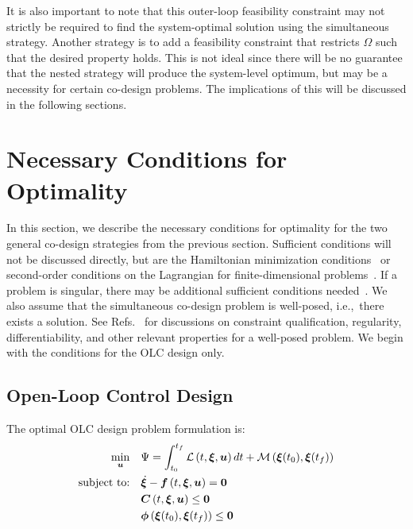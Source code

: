It is also important to note that this outer-loop feasibility constraint may not strictly be required to find the system-optimal solution using the simultaneous strategy.
Another strategy is to add a feasibility constraint that restricts $\Omega$ such that the desired property holds.
This is not ideal since there will be no guarantee that the nested strategy will produce the system-level optimum, but may be a necessity for certain co-design problems.
The implications of this will be discussed in the following sections.

\section{Necessary Conditions for Optimality \label{sec:ch3:conditions}}

In this section, we describe the necessary conditions for optimality for the two general co-design strategies from the previous section. Sufficient conditions will not be discussed directly, but are the Hamiltonian minimization conditions~\cite{Liberzon2012a, Chachuat2007a, Bryson1975a} or second-order conditions on the Lagrangian for finite-dimensional problems~\cite{Papalambros2017a}.
If a problem is singular, there may be additional sufficient conditions needed~\cite{Chachuat2007a, Bryson1975a}.
We also assume that the simultaneous co-design problem is well-posed, i.e.,~there exists a solution. See Refs.~\cite{Liberzon2012a, Chachuat2007a, Papalambros2017a} for discussions on constraint qualification, regularity, differentiability, and other relevant properties for a well-posed problem.
We begin with the conditions for the OLC design only.

\subsection{Open-Loop Control Design}

The optimal OLC design problem formulation is:
\begingroup
\allowdisplaybreaks
\begin{subequations}
\label{eq:ch3:ocsd}
\begin{align}
\min_{\bm{u}} \quad & \Psi = \int_{t_0}^{t_f} \mathcal{L} \left( t, \bm{\xi}, \bm{u} \right) dt + \mathcal{M} \left( \bm{\xi}(t_0), \bm{\xi}(t_f) \right) \\
\text{subject to:} \quad & \dot{\bm{\xi}} - \bm{f} \left( t, \bm{\xi}, \bm{u} \right) = \bm{0} \label{eq:ch3:ocsd_2} \\
& \bm{C} \left( t, \bm{\xi}, \bm{u} \right) \leq \bm{0} \label{eq:ch3:ocsd_3} \\
& \bm{\phi} \left( \bm{\xi}(t_0), \bm{\xi}(t_f) \right) \leq \bm{0} \label{eq:ch3:ocsd_4}
\end{align}
\end{subequations}
\endgroup

